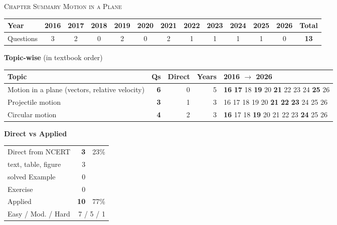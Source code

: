 \begin{center}{}\par
{\large\color{navy}\scshape Chapter Summary \textperiodcentered{} Motion in a Plane}\end{center}
{\small\setlength{\tabcolsep}{3.5pt}
\begin{tabular*}{\linewidth}{@{\extracolsep{\fill}}l*{11}{c}c@{}}\toprule
Year & 2016 & 2017 & 2018 & 2019 & 2020 & 2021 & 2022 & 2023 & 2024 & 2025 & 2026 & Total\\\midrule
Questions & 3 & 2 & 0 & 2 & 0 & 2 & 1 & 1 & 1 & 1 & 0 & \textbf{13}\\\bottomrule\end{tabular*}}\par\medskip
{\small\textbf{\color{crimson}Topic-wise} (in textbook order)\par\smallskip
\begin{tabularx}{\linewidth}{@{}>{\raggedright\arraybackslash}Xrrrl@{}}\toprule
Topic & Qs & Direct & Years & 2016 $\rightarrow$ 2026\\\midrule
Motion in a plane (vectors, relative velocity) & \textbf{6} & 0 & 5 & {\scriptsize \textbf{16} \textbf{17} {\color{gray!45}18} \textbf{19} {\color{gray!45}20} \textbf{21} {\color{gray!45}22} {\color{gray!45}23} {\color{gray!45}24} \textbf{25} {\color{gray!45}26}}\\
Projectile motion & \textbf{3} & 1 & 3 & {\scriptsize {\color{gray!45}16} {\color{gray!45}17} {\color{gray!45}18} {\color{gray!45}19} {\color{gray!45}20} \textbf{21} \textbf{22} \textbf{23} {\color{gray!45}24} {\color{gray!45}25} {\color{gray!45}26}}\\
Circular motion & \textbf{4} & 2 & 3 & {\scriptsize \textbf{16} {\color{gray!45}17} {\color{gray!45}18} \textbf{19} {\color{gray!45}20} {\color{gray!45}21} {\color{gray!45}22} {\color{gray!45}23} \textbf{24} {\color{gray!45}25} {\color{gray!45}26}}\\
\bottomrule\end{tabularx}}\par\medskip
\begin{minipage}[t]{0.34\linewidth}{\small\textbf{\color{crimson}Direct vs Applied}\par\smallskip
\begin{tabular}{@{}lrr@{}}\toprule
Direct from NCERT & \textbf{3} & 23\%\\
\quad text, table, figure & 3 &\\
\quad solved Example & 0 &\\
\quad Exercise & 0 &\\
Applied & \textbf{10} & 77\%\\\midrule
Easy / Mod. / Hard & \multicolumn{2}{r}{7 / 5 / 1}\\\bottomrule
\end{tabular}}\end{minipage}\hfill
